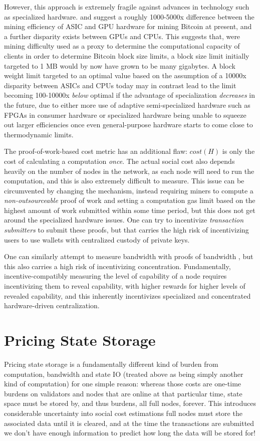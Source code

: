 \documentclass[12pt, final]{article}
\begin{document}
However, this approach is extremely fragile against advances in technology such as specialized hardware. \cite{hardware1} and \cite{hardware2} suggest a roughly 1000-5000x difference between the mining efficiency of ASIC and GPU hardware for mining Bitcoin at present, and a further disparity exists between GPUs and CPUs. This suggests that, were mining difficulty used as a proxy to determine the computational capacity of clients in order to determine Bitcoin block size limits, a block size limit initially targeted to 1 MB would by now have grown to be many gigabytes. A block weight limit targeted to an optimal value based on the assumption of a 10000x disparity between ASICs and CPUs today may in contrast lead to the limit becoming 100-10000x \emph{below} optimal if the advantage of specialization \emph{decreases} in the future, due to either more use of adaptive semi-specialized hardware such as FPGAs in consumer hardware or specialized hardware being unable to squeeze out larger efficiencies once even general-purpose hardware starts to come close to thermodynamic limits.

The proof-of-work-based cost metric has an additional flaw: $cost(H)$ is only the cost of calculating a computation \emph{once}. The actual social cost also depends heavily on the number of nodes in the network, as each node will need to run the computation, and this is also extremely difficult to measure. This issue can be circumvented by changing the mechanism, instead requiring miners to compute a \emph{non-outsourceable} proof of work \cite{nonoutsourceable} and setting a computation gas limit based on the highest amount of work submitted within some time period, but this does not get around the specialized hardware issues. One can try to incentivize \emph{transaction submitters} to submit these proofs, but that carries the high risk of incentivizing users to use wallets with centralized custody of private keys.

One can similarly attempt to measure bandwidth with proofs of bandwidth \cite{proof-of-bandwidth}, but this also carries a high risk of incentivizing concentration. Fundamentally, incentive-compatibly measuring the level of capability of a node requires incentivizing them to reveal capability, with higher rewards for higher levels of revealed capability, and this inherently incentivizes specialized and concentrated hardware-driven centralization.

\section{Pricing State Storage}
\label{sect:storage}
Pricing state storage is a fundamentally different kind of burden from computation, bandwidth and state IO (treated above as being simply another kind of computation) for one simple reason: whereas those costs are one-time burdens on validators and nodes that are online at that particular time, state space must be stored by, and thus burdens, all full nodes, forever. This introduces considerable uncertainty into social cost estimations  full nodes must store the associated data until it is cleared, and at the time the transactions are submitted we don’t have enough information to predict how long the data will be stored for!
\end{document}
